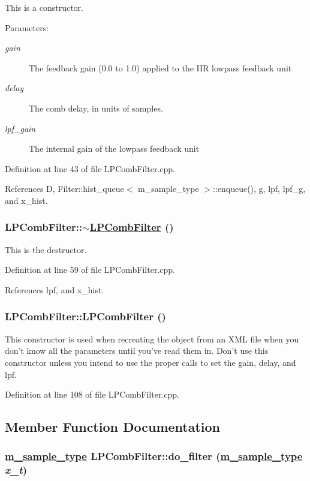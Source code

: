 This is a constructor. \begin{Desc}
\item[Parameters:]
\begin{description}
\item[{\em gain}]The feedback gain (0.0 to 1.0) applied to the IIR lowpass feedback unit \item[{\em delay}]The comb delay, in units of samples. \item[{\em lpf\_\-gain}]The internal gain of the lowpass feedback unit \end{description}
\end{Desc}


Definition at line 43 of file LPComb\-Filter.cpp.

References D, Filter::hist\_\-queue$<$ m\_\-sample\_\-type $>$::enqueue(), g, lpf, lpf\_\-g, and x\_\-hist.\hypertarget{classLPCombFilter_a1}{
\subsubsection[$\sim$LPCombFilter]{\setlength{\rightskip}{0pt plus 5cm}LPComb\-Filter::$\sim$\hyperlink{classLPCombFilter}{LPComb\-Filter} ()}}
\label{classLPCombFilter_a1}


This is the destructor. 

Definition at line 59 of file LPComb\-Filter.cpp.

References lpf, and x\_\-hist.\hypertarget{classLPCombFilter_a5}{
\subsubsection[LPCombFilter]{\setlength{\rightskip}{0pt plus 5cm}LPComb\-Filter::LPComb\-Filter ()}}
\label{classLPCombFilter_a5}


This constructor is used when recreating the object from an XML file when you don't know all the parameters until you've read them in. Don't use this constructor unless you intend to use the proper calls to set the gain, delay, and lpf. 

Definition at line 108 of file LPComb\-Filter.cpp.

\subsection{Member Function Documentation}
\hypertarget{classLPCombFilter_a2}{
\subsubsection[do\_\-filter]{\setlength{\rightskip}{0pt plus 5cm}\hyperlink{Types_8h_a0}{m\_\-sample\_\-type} LPComb\-Filter::do\_\-filter (\hyperlink{Types_8h_a0}{m\_\-sample\_\-type} {\em x\_\-t})}}
\label{classLPCombFilter_a2}


